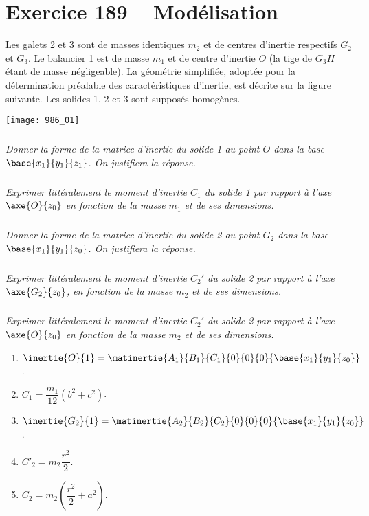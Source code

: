 \section*{Exercice 189 -- Modélisation}
\setcounter{exo}{0}

Les galets 2 et 3 sont de masses identiques $m_2$ et de centres d’inertie respectifs $G_2$ et $G_3$. Le balancier 1 est
de masse $m_1$ et de centre d’inertie $O$ (la tige de $G_3H$ étant de masse négligeable). La géométrie simplifiée,
adoptée pour la détermination préalable des caractéristiques d'inertie, est décrite sur la figure suivante.
Les solides 1, 2 et 3 sont supposés homogènes.

\begin{center}
\texttt{[image: 986\_01]}%
\end{center}


\subparagraph{}
\textit{Donner la forme de la matrice d’inertie du solide 1 au point $O$ dans la base
$\base{x_1}{y_1}{z_1}$. On justifiera la réponse.}
\ifprof
\begin{corrige}
\end{corrige}
\else
\fi

\subparagraph{}
\textit{Exprimer littéralement le moment d’inertie $C_1$ du solide 1 par rapport à l’axe $\axe{O}{z_0}$
 en fonction de la masse $m_1$ et de ses dimensions.}
\ifprof
\begin{corrige}
\end{corrige}
\else
\fi

\subparagraph{}
\textit{Donner la forme de la matrice d’inertie du solide 2 au point $G_2$ dans la base $\base{x_1}{y_1}{z_0}$. On justifiera la réponse.}
\ifprof
\begin{corrige}
\end{corrige}
\else
\fi

\subparagraph{}
\textit{Exprimer littéralement le moment d’inertie $C_2'$ du solide 2 par rapport à l’axe $\axe{G_2}{z_0}$, en fonction de la masse $m_2$ et de ses dimensions.}
\ifprof
\begin{corrige}
\end{corrige}
\else
\fi

\subparagraph{}
\textit{Exprimer littéralement le moment d’inertie $C_2'$ du solide 2 par rapport à l’axe $\axe{O}{z_0}$ en fonction de la masse $m_2$ et de ses dimensions.}
\ifprof
\begin{corrige}
\end{corrige}
\else
\fi
%

\begin{enumerate}
\item $\inertie{O}{1}=\matinertie{A_1}{B_1}{C_1}{0}{0}{0}{\base{x_1}{y_1}{z_0}}$.
\item $C_1 = \dfrac{m_1}{12}\left( b^2 + c^2\right)$.
\item $\inertie{G_2}{1}=\matinertie{A_2}{B_2}{C_2}{0}{0}{0}{\base{x_1}{y_1}{z_0}}$.
\item $C'_2 = m_2 \dfrac{r^2}{2}$.
\item $C_2 = m_2\left(\dfrac{r^2}{2}+a^2\right)$.
\end{enumerate}
